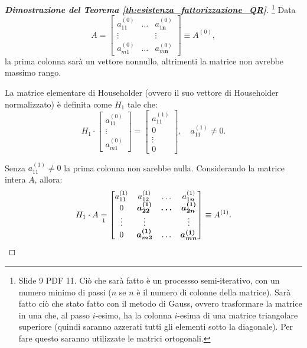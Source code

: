 \begin{proof}[\textbf{Dimostrazione del Teorema \ref{th:esistenza_fattorizzazione_QR}}]\footnote{Slide 9 PDF 11. Ciò che sarà fatto è un processso semi-iterativo, con un numero minimo di passi ($n$ se $n$ è il numero di colonne della matrice). Sarà fatto ciò che stato fatto con il metodo di Gauss, ovvero trasformare la matrice in una che, al passo $i$-esimo, ha la colonna $i$-esima di una matrice triangolare superiore (quindi saranno azzerati tutti gli elementi sotto la diagonale). Per fare questo saranno utilizzate le matrici ortogonali.}
    Data
    \begin{equation*}
        A=\begin{bmatrix}
            a_{11}^{(0)}& \hdots & a_{1\boldsymbol n}^{(0)}\\
            \vdots & & \vdots\\
            a_{m1}^{(0)} &\hdots & a_{m\boldsymbol n}^{(0)}
        \end{bmatrix}\equiv A^{(0)},
    \end{equation*}
    la prima colonna sarà un vettore nonnullo, altrimenti la matrice non avrebbe massimo rango.
    
    La matrice elementare di Householder (ovvero il suo vettore di Householder normalizzato) è definita come $H_1$ tale che:
    \begin{equation*}
        H_1\cdot\begin{bmatrix}
            a_{11}^{(0)}\\
            \vdots\\
            a_{m1}^{(0)}
        \end{bmatrix}=\begin{bmatrix}
            a_{11}^{(1)}\\
            0\\
            \vdots\\
            0
        \end{bmatrix},\quad a_{11}^{(1)}\neq 0.
    \end{equation*}
    
    Senza $a_{11}^{(1)}\neq 0$ la prima colonna non sarebbe nulla. Considerando la matrice intera $A$, allora:
    \begin{equation*}
        H_1\cdot A \underset{\footnotemark}{=} 
        \begin{bmatrix}
            a_{11}^{(1)}& a_{12}^{(1)} &\hdots & a_{1\boldsymbol n}^{(1)}\\
            0 & \boldsymbol{a_{22}^{(1)}} & \boldsymbol\hdots & \boldsymbol{a_{2n}^{(1)}} \\
            \vdots & \boldsymbol{\vdots}  & & \boldsymbol{\vdots}\\
            0 & \boldsymbol{a_{m2}^{(1)}} & \hdots & \boldsymbol{a_{mn}^{(1)}}
        \end{bmatrix}\equiv A^{(1)}.
    \end{equation*}
    

\end{proof}
